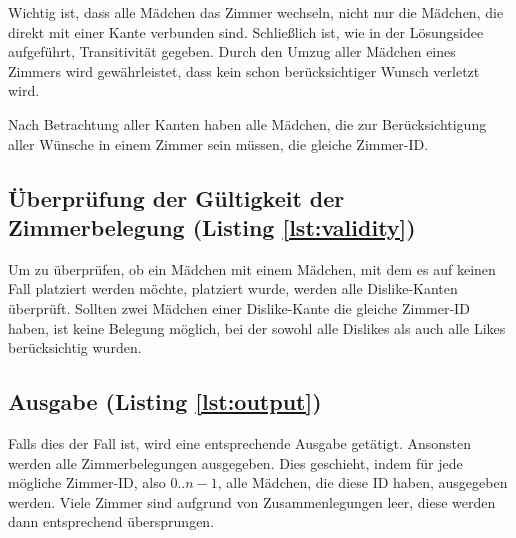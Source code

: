 Wichtig ist, dass alle Mädchen das Zimmer wechseln, nicht nur die Mädchen, die direkt mit einer Kante verbunden sind. Schließlich ist, wie in der Lösungsidee aufgeführt, Transitivität gegeben. Durch den Umzug aller Mädchen eines Zimmers wird gewährleistet, dass kein schon berücksichtiger Wunsch verletzt wird.

Nach Betrachtung aller Kanten haben alle Mädchen, die zur Berücksichtigung aller Wünsche in einem Zimmer sein müssen, die gleiche Zimmer-ID.

\subsection{Überprüfung der Gültigkeit der Zimmerbelegung (Listing \ref{lst:validity})}
Um zu überprüfen, ob ein Mädchen mit einem Mädchen, mit dem es auf keinen Fall platziert werden möchte, platziert wurde, werden alle Dislike-Kanten überprüft. Sollten zwei Mädchen einer Dislike-Kante die gleiche Zimmer-ID haben, ist keine Belegung möglich, bei der sowohl alle Dislikes als auch alle Likes berücksichtig wurden.

\subsection{Ausgabe (Listing \ref{lst:output})}
Falls dies der Fall ist, wird eine entsprechende Ausgabe getätigt. 
Ansonsten werden alle Zimmerbelegungen ausgegeben. Dies geschieht, indem für jede mögliche Zimmer-ID, also \(0 .. n-1\), alle Mädchen, die diese ID haben, ausgegeben werden. Viele Zimmer sind aufgrund von Zusammenlegungen leer, diese werden dann entsprechend übersprungen.
